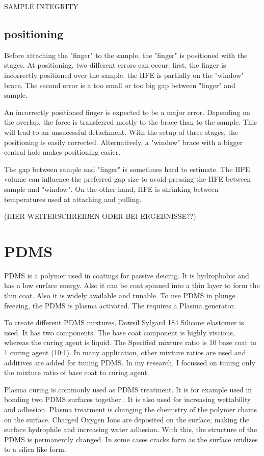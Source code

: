 SAMPLE INTEGRITY

\subsection{positioning}

Before attaching the "finger" to the sample, the "finger" is positioned with the stages. At positioning, two different errors can occur: first, the finger is incorrectly positioned over the sample. the HFE is partially on the "window" brace. The second error is a too small or too big gap between "finger" and sample. 

An incorrectly positioned finger is expected to be a major error. Depending on the overlap, the force is transferred mostly to the brace than to the sample. This will lead to an unsucessful detachment. With the setup of three stages, the positioning is easily corrected. Alternatively, a "window" brace with a bigger central hole makes positioning easier.

The gap between sample and "finger" is sometimes hard to estimate. The HFE volume can influence the preferred gap size to avoid pressing the HFE between sample and "window". On the other hand, HFE is shrinking between temperatures used at attaching and pulling.

 (HIER WEITERSCHREIBEN ODER BEI ERGEBNISSE??) 

\section{PDMS}

PDMS is a polymer used in coatings for passive deicing. It is hydrophobic and has a low surface energy. Also it can be coat spinned into a thin layer to form the thin coat. Also it is widely available and tunable. To use PDMS in plunge freezing, the PDMS is plasma activated. The requires a Plasma generator.

To create different PDMS mixtures, Dowsil Sylgard 184 Silicone elastomer is used\cite{DOW.}. It has two components.  The base coat component is highly viscious, whereas the curing agent is liquid. The Specified mixture ratio is 10 base coat to 1 curing agent (10:1). In many application, other mixture ratios are used and additives are added for tuning PDMS. In my research, I focussed on tuning only the mixture ratio of base coat to curing agent. 

Plasma curing is commonly used as PDMS treatment. It is for example used in bonding two PDMS surfaces together \cite{Borok.2021}. It is also used for increasing wettability and adhesion. Plasma treatment is changing the chemistry of the polymer chains on the surface. Charged Oxygen Ions are deposited on the surface, making the surface hydrophile and increasing water adhesion. With this, the structure of the PDMS is permanently changed. In some cases cracks form as the surface oxidizes to a silica like form.

